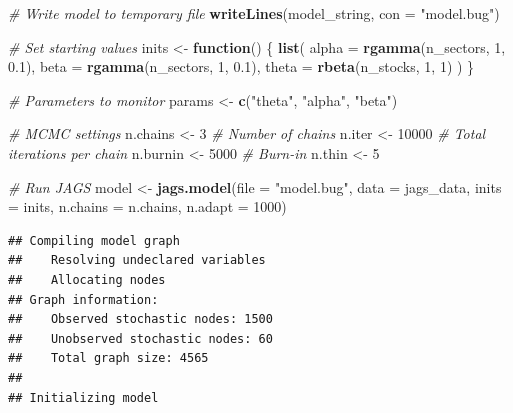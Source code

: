 \documentclass[
  11pt,
]{article}
\newenvironment{Shaded}{\begin{snugshade}}{\end{snugshade}}
\newcommand{\AttributeTok}[1]{\textcolor[rgb]{0.13,0.29,0.53}{#1}}
\newcommand{\CommentTok}[1]{\textcolor[rgb]{0.56,0.35,0.01}{\textit{#1}}}
\newcommand{\ControlFlowTok}[1]{\textcolor[rgb]{0.13,0.29,0.53}{\textbf{#1}}}
\newcommand{\DecValTok}[1]{\textcolor[rgb]{0.00,0.00,0.81}{#1}}
\newcommand{\FloatTok}[1]{\textcolor[rgb]{0.00,0.00,0.81}{#1}}
\newcommand{\FunctionTok}[1]{\textcolor[rgb]{0.13,0.29,0.53}{\textbf{#1}}}
\newcommand{\NormalTok}[1]{#1}
\newcommand{\OtherTok}[1]{\textcolor[rgb]{0.56,0.35,0.01}{#1}}
\newcommand{\StringTok}[1]{\textcolor[rgb]{0.31,0.60,0.02}{#1}}
\begin{document}
\begin{Shaded}
\begin{Highlighting}[]
\CommentTok{\# Write model to temporary file}
\FunctionTok{writeLines}\NormalTok{(model\_string, }\AttributeTok{con =} \StringTok{"model.bug"}\NormalTok{)}

\CommentTok{\# Set starting values}
\NormalTok{inits }\OtherTok{\textless{}{-}} \ControlFlowTok{function}\NormalTok{() \{}
  \FunctionTok{list}\NormalTok{(}
    \AttributeTok{alpha =} \FunctionTok{rgamma}\NormalTok{(n\_sectors, }\DecValTok{1}\NormalTok{, }\FloatTok{0.1}\NormalTok{),}
    \AttributeTok{beta =} \FunctionTok{rgamma}\NormalTok{(n\_sectors, }\DecValTok{1}\NormalTok{, }\FloatTok{0.1}\NormalTok{),}
    \AttributeTok{theta =} \FunctionTok{rbeta}\NormalTok{(n\_stocks, }\DecValTok{1}\NormalTok{, }\DecValTok{1}\NormalTok{)}
\NormalTok{  )}
\NormalTok{\}}

\CommentTok{\# Parameters to monitor}
\NormalTok{params }\OtherTok{\textless{}{-}} \FunctionTok{c}\NormalTok{(}\StringTok{"theta"}\NormalTok{, }\StringTok{"alpha"}\NormalTok{, }\StringTok{"beta"}\NormalTok{)}

\CommentTok{\# MCMC settings}
\NormalTok{n.chains }\OtherTok{\textless{}{-}} \DecValTok{3}      \CommentTok{\# Number of chains}
\NormalTok{n.iter }\OtherTok{\textless{}{-}} \DecValTok{10000}    \CommentTok{\# Total iterations per chain}
\NormalTok{n.burnin }\OtherTok{\textless{}{-}} \DecValTok{5000}   \CommentTok{\# Burn{-}in}
\NormalTok{n.thin }\OtherTok{\textless{}{-}} \DecValTok{5}

\CommentTok{\# Run JAGS}
\NormalTok{model }\OtherTok{\textless{}{-}} \FunctionTok{jags.model}\NormalTok{(}\AttributeTok{file =} \StringTok{"model.bug"}\NormalTok{,}
                    \AttributeTok{data =}\NormalTok{ jags\_data,}
                    \AttributeTok{inits =}\NormalTok{ inits,}
                    \AttributeTok{n.chains =}\NormalTok{ n.chains,}
                    \AttributeTok{n.adapt =} \DecValTok{1000}\NormalTok{)}
\end{Highlighting}
\end{Shaded}

\begin{verbatim}
## Compiling model graph
##    Resolving undeclared variables
##    Allocating nodes
## Graph information:
##    Observed stochastic nodes: 1500
##    Unobserved stochastic nodes: 60
##    Total graph size: 4565
## 
## Initializing model
\end{verbatim}
\end{document}
